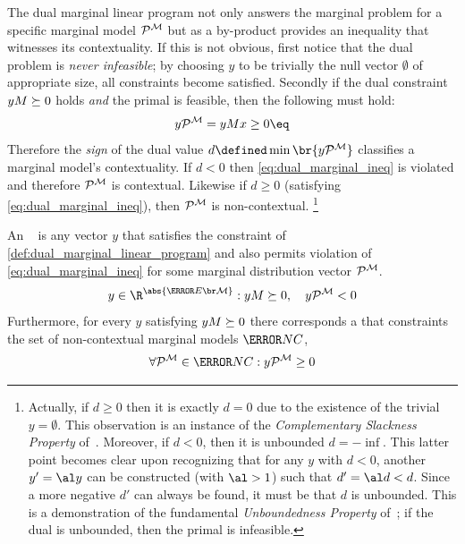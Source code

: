 \documentclass[aps, 10pt, english, twoside, pra, nofootinbib, longbibliography]{revtex4-1}
\begin{document}
    The dual marginal linear program not only answers the marginal problem for a specific marginal model $\probvec^{\mscenario}$ but as a by-product provides an inequality that witnesses its contextuality. If this is not obvious, first notice that the dual problem is \textit{never infeasible}; by choosing $y$ to be trivially the null vector $\emptyset$ of appropriate size, all constraints become satisfied. Secondly if the dual constraint $y  M \succeq 0$ holds \textit{and} the primal is feasible, then the following must hold:
    \[ y \tcdot \probvec^{\mscenario} =  y \tcdot M \tcdot x \geq 0 \eq \label{eq:dual_marginal_ineq} \]
    Therefore the \textit{sign} of the dual value $d \defined \min \br{y \tcdot \probvec^{\mscenario}}$ classifies a marginal model's contextuality. If $d < 0$ then \cref{eq:dual_marginal_ineq} is violated and therefore $\probvec^{\mscenario}$ is contextual. Likewise if $d \geq 0$ (satisfying \cref{eq:dual_marginal_ineq}), then $\probvec^{\mscenario}$ is non-contextual. \footnote{Actually, if $d \geq 0$ then it is exactly $d = 0$ due to the existence of the trivial $y = \emptyset$. This observation is an instance of the \textit{Complementary Slackness Property} of~\cite{Bradley_1977}.  Moreover, if $d < 0$, then it is unbounded $d = -\inf$. This latter point becomes clear upon recognizing that for any $y$ with $d < 0$, another $y' = \al y$ can be constructed (with $\al > 1$) such that $d' = \al d < d$. Since a more negative $d'$ can always be found, it must be that $d$ is unbounded. This is a demonstration of the fundamental \textit{Unboundedness Property} of~\cite{Bradley_1977}; if the dual is unbounded, then the primal is infeasible. }

    \begin{definition} An ~\cite{Andersen_2001} is any vector $y$ that satisfies the constraint of \cref{def:dual_marginal_linear_program} and also permits violation of \cref{eq:dual_marginal_ineq} for some marginal distribution vector $\probvec^{\mscenario}$.
    \[ y \in \R^{\abs{\Events{\mscenario}}} : y \tcdot M \succeq 0, \quad y \tcdot \probvec^{\mscenario} < 0 \]
    Furthermore, for every $y$ satisfying $y  M \succeq 0$ there corresponds a  that constraints the set of non-contextual marginal models $\s{NC}$,
    \[ \forall \probvec^{\mscenario} \in \s{NC} : y \tcdot \probvec^{\mscenario} \geq 0 \]
    \end{definition}
\end{document}
